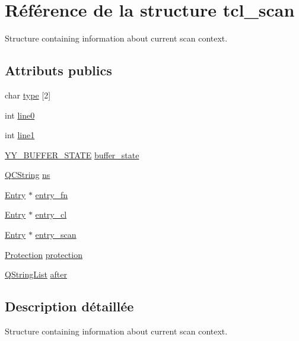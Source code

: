 \hypertarget{structtcl__scan}{}\section{Référence de la structure tcl\+\_\+scan}
\label{structtcl__scan}


Structure containing information about current scan context.  


\subsection*{Attributs publics}
\begin{DoxyCompactItemize}
\item 
char \hyperlink{structtcl__scan_a1e8465613aa17a4634c16633a479ced1}{type} \mbox{[}2\mbox{]}
\item 
int \hyperlink{structtcl__scan_a858b5f4a6e03f1db3e88b8413218ab04}{line0}
\item 
int \hyperlink{structtcl__scan_aaec63dc6756ade838f966b120cf10eb8}{line1}
\item 
\hyperlink{code_8cpp_a4e5bd2d129903df83f3d13effaf8f3e4}{Y\+Y\+\_\+\+B\+U\+F\+F\+E\+R\+\_\+\+S\+T\+A\+T\+E} \hyperlink{structtcl__scan_aaf056096a727f78a1be5b9a5dcf2a148}{buffer\+\_\+state}
\item 
\hyperlink{class_q_c_string}{Q\+C\+String} \hyperlink{structtcl__scan_a1f532136748d05b901b68d1ca71ae66b}{ns}
\item 
\hyperlink{class_entry}{Entry} $\ast$ \hyperlink{structtcl__scan_a398ca9e031679162c67ce3975639eff9}{entry\+\_\+fn}
\item 
\hyperlink{class_entry}{Entry} $\ast$ \hyperlink{structtcl__scan_aeb6315712af342cc7021ee06a6f99908}{entry\+\_\+cl}
\item 
\hyperlink{class_entry}{Entry} $\ast$ \hyperlink{structtcl__scan_ad98a63982cc5ec19c916304f7056c52f}{entry\+\_\+scan}
\item 
\hyperlink{types_8h_a90e352184df58cd09455fe9996cd4ded}{Protection} \hyperlink{structtcl__scan_aef45ec997f24054aa18863a2da0feffd}{protection}
\item 
\hyperlink{class_q_string_list}{Q\+String\+List} \hyperlink{structtcl__scan_a4bb2733591b422b55be8fffc83dbb317}{after}
\end{DoxyCompactItemize}


\subsection{Description détaillée}
Structure containing information about current scan context. 

